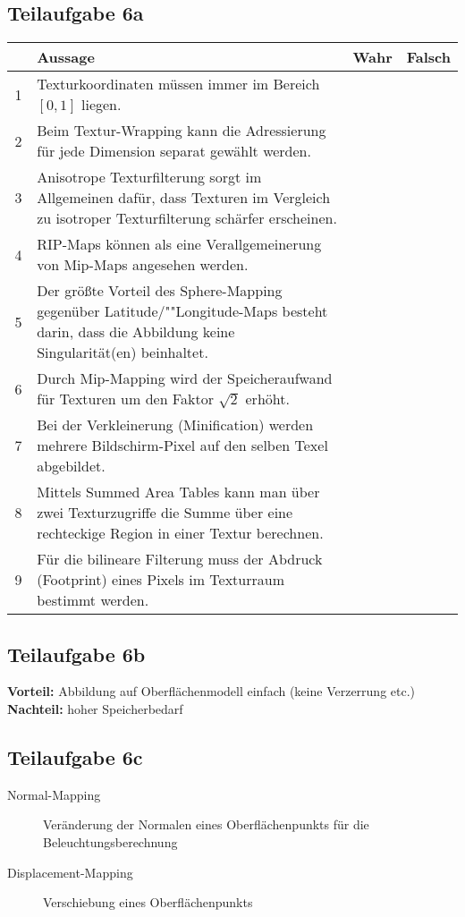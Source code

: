 \documentclass[a4paper]{scrartcl}
\begin{document}
\subsection*{Teilaufgabe 6a}
\begin{tabular}{cp{12cm}ll}\toprule
	~ & \textbf{Aussage} & \textbf{Wahr} & \textbf{Falsch} \\\midrule
	1 & Texturkoordinaten müssen immer im Bereich $[0, 1]$ liegen.
	  & \Square     & \CheckedBox \\
	2 & Beim Textur-Wrapping kann die Adressierung für jede Dimension separat gewählt werden.
	  & \CheckedBox & \Square     \\
	3 & Anisotrope Texturfilterung sorgt im Allgemeinen dafür, dass Texturen im Vergleich zu isotroper Texturfilterung schärfer erscheinen.
	  & \CheckedBox & \Square     \\
	4 & RIP-Maps können als eine Verallgemeinerung von Mip-Maps angesehen werden.
	  & \CheckedBox & \Square     \\
	5 & Der größte Vorteil des Sphere-Mapping gegenüber Latitude/""Longitude-Maps besteht darin, dass die Abbildung keine Singularität(en) beinhaltet.
	  & \Square     & \CheckedBox \\
	6 & Durch Mip-Mapping wird der Speicheraufwand für Texturen	um den Faktor $\sqrt{2}$ erhöht.
	  & \Square     & \CheckedBox \\
	7 & Bei der Verkleinerung (Minification) werden mehrere	Bildschirm-Pixel auf den selben Texel abgebildet.
	  & \CheckedBox & \Square     \\
	8 & Mittels Summed Area Tables kann man über zwei Texturzugriffe die Summe über eine rechteckige Region in einer Textur berechnen.
	  & \CheckedBox & \Square     \\
	9 & Für die bilineare Filterung muss der Abdruck (Footprint) eines Pixels im Texturraum bestimmt werden.
	  & \CheckedBox & \Square     \\\bottomrule
\end{tabular}

\subsection*{Teilaufgabe 6b}
\textbf{Vorteil:} Abbildung auf Oberflächenmodell einfach (keine Verzerrung etc.)\\
\textbf{Nachteil:} hoher Speicherbedarf

\subsection*{Teilaufgabe 6c}
\begin{description}
	\item[Normal-Mapping] Veränderung der Normalen eines Oberflächenpunkts für die Beleuchtungsberechnung
	\item[Displacement-Mapping] Verschiebung eines Oberflächenpunkts
\end{description}
\end{document}
